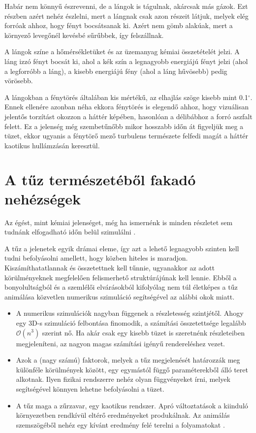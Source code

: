 Habár nem könnyű észrevenni, de a lángok is tágulnak, akárcsak más gázok. Ezt részben azért nehéz észlelni, mert a lángnak csak azon részeit látjuk, melyek elég forróak ahhoz, hogy fényt bocsátsanak ki. Azért nem gömb alakúak, mert a környező levegőnél kevésbé sűrűbbek, így felszállnak.

A lángok színe a hőmérsékletüket és az üzemanyag kémiai összetételét jelzi. A láng izzó fényt bocsát ki, ahol a kék szín a legnagyobb energiájú fényt jelzi (ahol a legforróbb a láng), a kisebb energiájú fény (ahol a láng hűvösebb) pedig vörösebb.

\cite{firePhysics1}

A lángokban a fénytörés általában kis mértékű, az elhajlás szöge kisebb mint 0.1$^{\circ}$. Ennek ellenére azonban néha ekkora fénytörés is elegendő ahhoz, hogy vizuálisan jelentős torzítást okozzon a háttér képében, hasonlóan a délibábhoz a forró aszfalt felett. Ez a jelenség még szembetűnőbb mikor hosszabb időn át figyeljük meg a tüzet, ekkor ugyanis a fénytörő mező turbulens természete felfedi magát a háttér kaotikus hullámzásán keresztül\cite{swhThreeDimensionalReconst}.

\section{A tűz természetéből fakadó nehézségek}

Az égést, mint kémiai jelenséget, még ha ismernénk is minden részletet sem tudnánk elfogadható időn belül szimulálni  \cite{firestarter}.

A tűz a jelenetek egyik drámai eleme, így azt a lehető legnagyobb szinten kell tudni befolyásolni amellett, hogy közben hiteles is maradjon. Kiszámíthatatlannak és összetettnek kell tűnnie, ugyanakkor az adott körülményeknek megfelelően felismerhető struktúrájúnak kell lennie. Ebből a bonyolultságból és a szemlélői elvárásokból kifolyólag nem túl életképes a tűz animálása közvetlen numerikus szimuláció segítségével az alábbi okok miatt.
\begin{itemize}
\item
A numerikus szimulációk nagyban függenek a részletesség szintjétől. Ahogy egy 3D-s szimuláció felbontása finomodik, a számítási összetettsége legalább $\mathcal{O}(n^3)$ szerint nő. Ha akár csak egy kisebb tüzet is szeretnénk részleteiben megjeleníteni, az nagyon magas számítási igényű rendereléshez vezet.
\item
Azok a (nagy számú) faktorok, melyek a tűz megjelenését határozzák meg különféle körülmények között, egy egymástól függő paraméterekből álló teret alkotnak. Ilyen fizikai rendszerre nehéz olyan függvényeket írni, melyek segítségével könnyen lehetne befolyásolni a tüzet. 
\item
A tűz maga a zűrzavar, egy kaotikus rendszer. Apró változtatások a kiinduló környezetben rendkívül eltérő eredményeket produkálnak. Az animálás szemszögéből nehéz egy kívánt eredmény felé terelni a folyamatokat \cite{ArNiStructuralModeling}.
\end{itemize}

